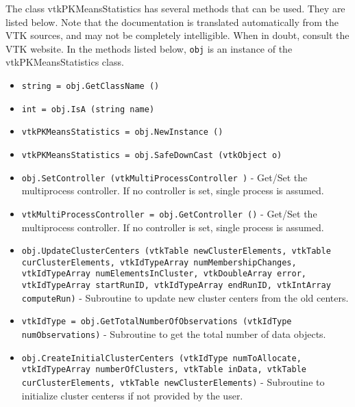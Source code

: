 The class vtkPKMeansStatistics has several methods that can be used.
  They are listed below.
Note that the documentation is translated automatically from the VTK sources,
and may not be completely intelligible.  When in doubt, consult the VTK website.
In the methods listed below, \verb|obj| is an instance of the vtkPKMeansStatistics class.
\begin{itemize}
\item  \verb|string = obj.GetClassName ()|

\item  \verb|int = obj.IsA (string name)|

\item  \verb|vtkPKMeansStatistics = obj.NewInstance ()|

\item  \verb|vtkPKMeansStatistics = obj.SafeDownCast (vtkObject o)|

\item  \verb|obj.SetController (vtkMultiProcessController )| -  Get/Set the multiprocess controller. If no controller is set,
 single process is assumed.

\item  \verb|vtkMultiProcessController = obj.GetController ()| -  Get/Set the multiprocess controller. If no controller is set,
 single process is assumed.

\item  \verb|obj.UpdateClusterCenters (vtkTable newClusterElements, vtkTable curClusterElements, vtkIdTypeArray numMembershipChanges, vtkIdTypeArray numElementsInCluster, vtkDoubleArray error, vtkIdTypeArray startRunID, vtkIdTypeArray endRunID, vtkIntArray computeRun)| -  Subroutine to update new cluster centers from the old centers.

\item  \verb|vtkIdType = obj.GetTotalNumberOfObservations (vtkIdType numObservations)| -  Subroutine to get the total number of data objects.

\item  \verb|obj.CreateInitialClusterCenters (vtkIdType numToAllocate, vtkIdTypeArray numberOfClusters, vtkTable inData, vtkTable curClusterElements, vtkTable newClusterElements)| -  Subroutine to initialize cluster centerss if not provided by the user.

\end{itemize}
